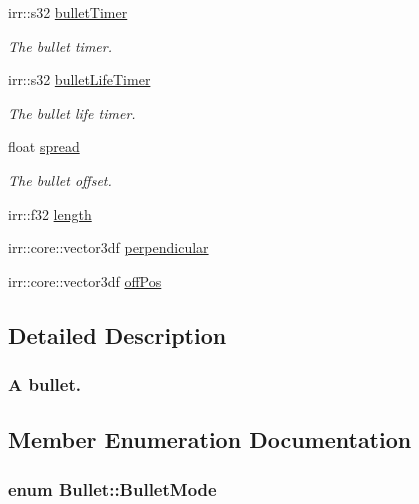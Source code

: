 \begin{DoxyCompactItemize}
irr\-::s32 \hyperlink{class_bullet_ac1b4825f9227b4411529519edce96ead}{bullet\-Timer}
\begin{DoxyCompactList}\small\item\em The bullet timer. \end{DoxyCompactList}\item 
irr\-::s32 \hyperlink{class_bullet_a5d564a2ba54760b213cc65a34c2a9bd5}{bullet\-Life\-Timer}
\begin{DoxyCompactList}\small\item\em The bullet life timer. \end{DoxyCompactList}\item 
float \hyperlink{class_bullet_ab941816334c79d597fe0d20225da563b}{spread}
\begin{DoxyCompactList}\small\item\em The bullet offset. \end{DoxyCompactList}\item 
irr\-::f32 \hyperlink{class_bullet_a069699cea42b5adef4c794164728b922}{length}
\item 
irr\-::core\-::vector3df \hyperlink{class_bullet_ab856dc3d3abad6d037d33de072474608}{perpendicular}
\item 
irr\-::core\-::vector3df \hyperlink{class_bullet_a501965fdc9f42f81c85025da2bb57b7e}{off\-Pos}
\end{DoxyCompactItemize}


\subsection{Detailed Description}


 

\subsubsection*{}

\subsubsection*{A bullet.  }

\subsection{Member Enumeration Documentation}
\hypertarget{class_bullet_a5d75af562dbb5f6f4f68584ca9193aa5}{
\subsubsection[{Bullet\-Mode}]{\setlength{\rightskip}{0pt plus 5cm}enum {\bf Bullet\-::\-Bullet\-Mode}}}\label{class_bullet_a5d75af562dbb5f6f4f68584ca9193aa5}


